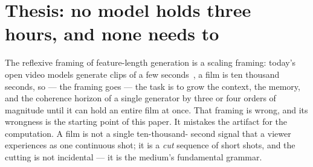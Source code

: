 \documentclass[11pt]{article}
\begin{document}
\begin{abstract}
Third, the \textbf{systems} reading: a feature render is an \emph{embarrassingly parallel throughput job} ---
$\sim$2000 independent shot-jobs over the series' measured heterogeneous ring~\cite{het} --- with the bible as a
shared conditioning \emph{prefix} that prefix-caches across every shot, and each shot an \emph{idempotent},
content-hashed unit that makes a three-hour render a resumable build DAG. The \emph{assembly} half of this is
now measured end to end in the native orchestrator --- a full three-hour placeholder cut assembles in under
$30$\,s on one box ($\approx\!9$\,s across three nodes; per-shot $\approx\!0.21$--$0.26$\,s), and re-rendering
recomputes \emph{zero} shots --- while the \emph{generative} per-shot time stays labelled a projection until the
Wan-class video port lands, at which point the same wall-clock template resolves. Fourth, \textbf{open problems} specific to film that neither companion owns: perceptual
metrics for narrative coherence, the shot-length-versus-drift trade, motif persistence across musical cues,
lip-sync integration for dialogue shots, and the rights and provenance of persistent generated identities. The
substrate numbers we lean on are measured and cited to the hardware that produced them; every number about a
feature-length artifact on our stack is labelled projection.
\end{abstract}

\section{Thesis: no model holds three hours, and none needs to}
\label{sec:thesis}

The reflexive framing of feature-length generation is a scaling framing: today's open video models generate
clips of a few seconds~\cite{selfforcing,skyreels2}, a film is ten thousand seconds, so --- the framing goes ---
the task is to grow the context, the memory, and the coherence horizon of a single generator by three or four
orders of magnitude until it can hold an entire film at once. That framing is wrong, and its wrongness is the
starting point of this paper. It mistakes the artifact for the computation. A film is not a single ten-thousand-
second signal that a viewer experiences as one continuous shot; it is a \emph{cut} sequence of short shots, and
the cutting is not incidental --- it is the medium's fundamental grammar.
\end{document}
